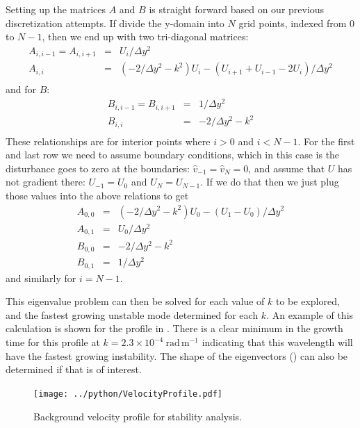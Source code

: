 \documentclass[11pt]{article}
\begin{document}
Setting up the matrices $A$ and $B$ is straight forward based on our previous
discretization attempts.  If divide the y-domain into $N$ grid points, indexed
from $0$ to $N-1$, then we end up with two tri-diagonal matrices: 
\begin{eqnarray*}
  A_{i, i-1} = A_{i, i+1} & = & U_i / \Delta y^2\\
  A_{i, i} & = &  \left(-2 /\Delta y^2 -k^2\right)U_i -(U_{i+1} + U_{i-1} -2
U_i)/\Delta y ^2\\
\end{eqnarray*} 
and for $B$:
\begin{eqnarray*}
  B_{i, i-1} = B_{i, i+1} & = & 1 / \Delta y^2\\
  B_{i, i} & = &  -2 /\Delta y^2 -k^2 \\
\end{eqnarray*} 
These relationships are for interior points where $i>0$ and $i<N-1$.  For the
first and last row we need to assume boundary conditions, which in this case is
the disturbance goes to zero at the boundaries: $\hat{v}_{-1} = \hat{v}_{N} =
0$, and assume that $U$ has not gradient there: $U_{-1} = U_0$ and $U_{N} =
U_{N-1}$.  If we do that then we just plug those values into the above
relations to get 
\begin{eqnarray*}
A_{0, 0} &=& \left(-2 /\Delta y^2 -k^2\right)U_0 -(U_1 - U_0)/\Delta y ^2\\
A_{0, 1} & = &U_0/\Delta y^2\\
B_{0, 0} & = &  -2 /\Delta y^2 -k^2 \\
B_{0, 1} & = & 1 / \Delta y^2
\end{eqnarray*}
and similarly for $i=N-1$.   

This eigenvalue problem can then be solved for each value of $k$ to be
explored, and the fastest growing unstable mode determined for each $k$.  An
example of this calculation is shown for the profile in
.  There is a clear minimum in the growth time for
this profile at $k=2.3\times10^{-4}\ \mathrm{rad\,m^{-1}}$ indicating that this
wavelength will have the fastest growing instability.  The shape of the
eigenvectors () can also be determined if that is of
interest.        

\begin{figure}[hbtp]
  \begin{center}
    \texttt{[image: ../python/VelocityProfile.pdf]}
  \end{center}
    \caption{Background velocity profile for stability analysis.}
    \label{fig:VelocityProfile}
\end{figure}
\end{document}
